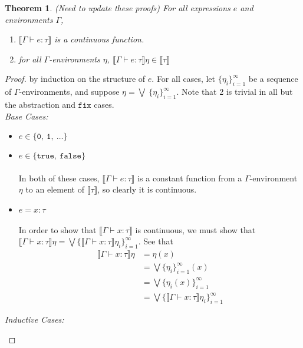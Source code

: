 \documentclass{westhesis}
\theoremstyle{plain}
\newtheorem{thm}{Theorem}
\theoremstyle{definition}
\begin{document}
\begin{thm} 
(Need to update these proofs)
For all expressions $e$ and environments $\Gamma$,
\begin{enumerate}
\item $\llbracket \Gamma \vdash e : \tau \rrbracket$ is a continuous function. 
\item for all $\Gamma$-environments $\eta$, $\llbracket \Gamma \vdash e : \tau \rrbracket\eta \in \llbracket \tau \rrbracket$ 
\end{enumerate}
\end{thm}
\begin{proof}
by induction on the structure of $e$. For all cases, let $\{ \eta_i \}^{\infty}_{i=1}$ be a sequence of $
 \Gamma$-environments, and suppose $ \eta = \bigvee \ \{ \eta_i \}^{\infty}_{i=1}$. Note that 2 is trivial in all but the abstraction
 and $\texttt{fix}$ cases.\\
 \emph{Base Cases: } 
 \begin{itemize}
 \item $e \in \{ \texttt{0}, \ \texttt{1}, \ \ldots \}$
 \item $e \in \{ \texttt{true}, \ \texttt{false} \}$\\ \\
  In both of these cases, $\llbracket \Gamma \vdash e : \tau \rrbracket$ is a constant function from a $\Gamma$-environment
 $\eta$ to an element of $\llbracket \tau \rrbracket$, so clearly it is continuous. 
 \item $e = x : \tau$ \\ \\
 In order to show that $\llbracket \Gamma \vdash x : \tau \rrbracket$ is continuous, we 
 must show that $\llbracket \Gamma \vdash x : \tau \rrbracket\eta = \bigvee \{ \llbracket \Gamma \vdash x : \tau \rrbracket
  \eta_i \}^{\infty}_{i=1}$. See that
  \begin{align*}
  \llbracket \Gamma \vdash x : \tau \rrbracket\eta &= \eta(x) \\
  &= \bigvee\{\eta_i\}^{\infty}_{i=1}(x) \\
  &= \bigvee\{\eta_i(x)\}^{\infty}_{i=1} \\
  &= \bigvee\{\llbracket \Gamma \vdash x : \tau \rrbracket\eta_i \}^{\infty}_{i=1}
  \end{align*}
 \end{itemize}
 \emph{Inductive Cases: }
 \begin{itemize}

\end{itemize}
\end{proof}
\end{document}
